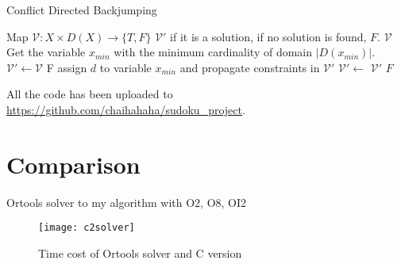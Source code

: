 \documentclass[10pt,aspectratio=43,mathserif]{beamer}
\begin{document}
        \begin{frame}[allowframebreaks]{Conflict Directed Backjumping}
            \begin{algorithmic}[1]
                    \Require Map $\mathcal V:X\times D(X) \to \{T,F\}$
                    \Ensure $\mathcal V'$ if it is a solution, if no solution is found, $F$.
                            \State \Return $\mathcal V$
                        \EndIf
                        \State Get the variable $x_{min}$ with the minimum cardinality of domain $|D(x_{min})|$.
                            \State $\mathcal V' \gets \mathcal V$ 
                                    \State \Return F  
                                \EndIf
                            \EndFor
                            \State assign $d$ to variable $x_{min}$ and propagate constraints in $\mathcal V'$
                                \State $\mathcal V'\gets$ 
                                    \State \Return $\mathcal V'$
                                \EndIf
                            \EndIf
                        \EndFor
                        \State \Return $F$
                    \EndFunction
                \end{algorithmic}

                All the code has been uploaded to \url{https://github.com/chaihahaha/sudoku_project}.
        \end{frame}

    \section{Comparison}
        \begin{frame}{Ortools solver to my algorithm with O2, O8, OI2}
            \begin{figure}[H]
            \centering
            \texttt{[image: c2solver]}
            \caption{Time cost of Ortools solver and C version}
            \end{figure}
        \end{frame}
\end{document}
